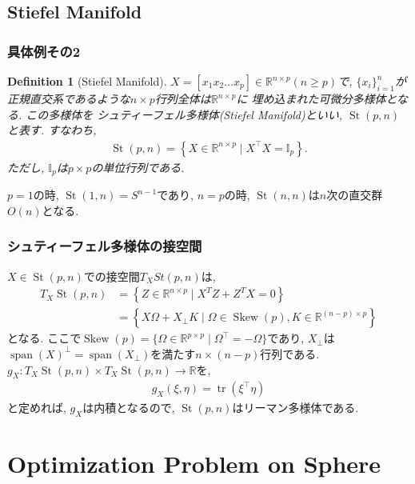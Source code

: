 \documentclass[dvipdfmx,11pt]{beamer}		%
\newtheorem{defi}{Definition}
\newcommand{\R}{\mathbb{R}}
\begin{document}
    \subsection{Stiefel Manifold}
    \begin{frame}
        \frametitle{具体例その2}
        \begin{defi}[Stiefel Manifold]
            $X = [x_1 x_2 \ldots x_p]\in\R^{n\times p} (n\geq p)$で, 
            $\{x_{i}\}_{i = 1}^{n}$が正規直交系であるような$n\times p$行列全体は$\R^{n\times p}$に
            埋め込まれた可微分多様体となる. この多様体を
            シュティーフェル多様体(Stiefel Manifold)といい, $\operatorname{St}(p, n)$と表す. すなわち, 
            \begin{align*}
                \operatorname{St}(p, n) = \left\{X\in\R^{n\times p}\mid X^{\top}X = \mathbb{I}_{p}\right\}.
            \end{align*}
            ただし, $\mathbb{I}_{p}$は$p\times p$の単位行列である.
        \end{defi}
        $p = 1$の時, $\operatorname{St}(1, n) = S^{n - 1}$であり, $n = p$の時, $\operatorname{St}(n, n)$は$n$次の直交群$O(n)$となる.
    \end{frame}
    \begin{frame}
        \frametitle{シュティーフェル多様体の接空間}
        $X\in\operatorname{St}(p, n)$での接空間$T_{X}St(p, n)$は, 
        \begin{align*}
            T_{X} \operatorname{St}(p, n)&=\left\{Z \in \mathbb{R}^{n \times p}\mid X^{T} Z+Z^{T} X=0\right\}\\
                                         &= \left\{X \Omega+X_{\perp} K\mid \Omega\in\operatorname{Skew}(p), K \in \mathbb{R}^{(n-p) \times p}\right\}
        \end{align*}
        となる. ここで$\operatorname{Skew}(p) = \{\Omega\in\R^{p\times p}\mid \Omega^{\top} = -\Omega\}$であり, 
        $X_{\perp}$は$\operatorname{span}(X)^{\perp} = \operatorname{span}(X_{\perp})$を満たす$n\times (n - p)$行列である.
        $g_{X} : T_{X}\operatorname{St}(p, n)\times T_{X}\operatorname{St}(p, n)\to\R$を,
        \begin{align*}
            g_{X}(\xi, \eta) = \operatorname{tr}(\xi^{\top} \eta)
        \end{align*}
        と定めれば, $g_{X}$は内積となるので, $\operatorname{St}(p, n)$はリーマン多様体である. 
    \end{frame}
 
    
\section{Optimization Problem on Sphere}
\end{document}
